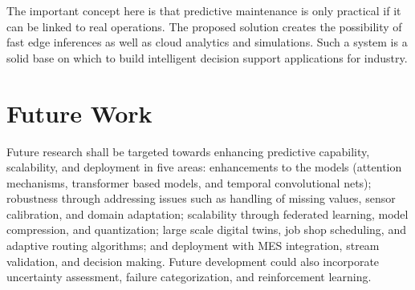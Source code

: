 \documentclass[conference]{IEEEtran}
\begin{document}
The important concept here is that predictive maintenance is only practical if it can be linked to real operations. The proposed solution creates the possibility of fast edge inferences as well as cloud analytics and simulations. Such a system is a solid base on which to build intelligent decision support applications for industry.

\section{Future Work}

Future research shall be targeted towards enhancing predictive capability, scalability, and deployment in five areas: enhancements to the models (attention mechanisms, transformer based models, and temporal convolutional nets); robustness through addressing issues such as handling of missing values, sensor calibration, and domain adaptation; scalability through federated learning, model compression, and quantization; large scale digital twins, job shop scheduling, and adaptive routing algorithms; and deployment with MES integration, stream validation, and decision making. Future development could also incorporate uncertainty assessment, failure categorization, and reinforcement learning.
\end{document}
